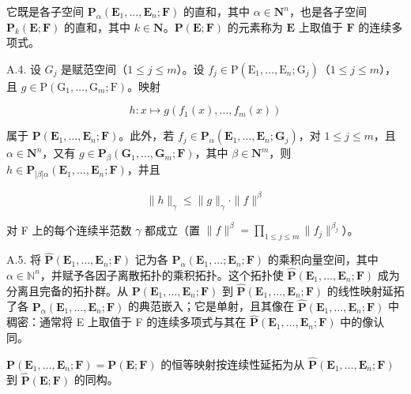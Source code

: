 它既是各子空间 \(\mathbf{P}_{\alpha}(\mathbf{E}_{1},\ldots,\mathbf{E}_{n};\mathbf{F})\) 的直和，其中 \(\alpha\in\mathbf{N}^{n}\)，也是各子空间 \(\mathbf{P}_{k}(\mathbf{E};\mathbf{F})\) 的直和，其中 \(k\in\mathbf{N}\)。\(\mathbf{P}(\mathbf{E};\mathbf{F})\) 的元素称为 \(\mathbf{E}\) 上取值于 \(\mathbf{F}\) 的连续多项式。

A.4. 设 \(G_{j}\) 是赋范空间（\(1 \leqslant j \leqslant m\)）。设 \(f_{j} \in \mathrm{P}(\mathrm{E}_{1}, \ldots, \mathrm{E}_{n}; \mathrm{G}_{j})\)（\(1 \leqslant j \leqslant m\)），且 \(g \in \mathrm{P}(\mathrm{G}_{1}, \ldots, \mathrm{G}_{m}; \mathrm{F})\)。映射

\[
h: x \mapsto g (f _ {1} (x), \dots , f _ {m} (x))
\]

属于 \(\mathbf{P}(\mathbf{E}_1,\ldots ,\mathbf{E}_n;\mathbf{F})\)。此外，若 \(f_{j}\in \mathbf{P}_{\alpha}(\mathbf{E}_{1},\ldots ,\mathbf{E}_{n};\mathbf{G}_{j})\)，对 \(1\leqslant j\leqslant m\)，且 \(\alpha \in \mathbf{N}^n\)，又有 \(g\in \mathbf{P}_{\beta}(\mathbf{G}_1,\ldots ,\mathbf{G}_m;\mathbf{F})\)，其中 \(\beta \in \mathbf{N}^{m}\)，则 \(h\in \mathbf{P}_{|\beta |\alpha}(\mathbf{E}_1,\ldots ,\mathbf{E}_n;\mathbf{F})\)，并且

\[
\| h \| _ {\gamma} \leqslant \| g \| _ {\gamma} \cdot \| f \| ^ {\beta}
\]

对 F 上的每个连续半范数 \(\gamma\) 都成立（置 \(\| f\|^{\beta} = \prod_{1 \leqslant j \leqslant m} \| f_j \|^{\beta_j}\)）。

A.5. 将 \(\hat{\mathbf{P}}(\mathbf{E}_{1},\ldots,\mathbf{E}_{n};\mathbf{F})\) 记为各 \(\mathbf{P}_{\alpha}(\mathbf{E}_{1},\ldots;\mathbf{E}_{n};\mathbf{F})\) 的乘积向量空间，其中 \(\alpha\in\mathbb{N}^{n}\)，并赋予各因子离散拓扑的乘积拓扑。这个拓扑使 \(\hat{\mathbf{P}}(\mathbf{E}_{1},\ldots,\mathbf{E}_{n};\mathbf{F})\) 成为分离且完备的拓扑群。从 \(\mathbf{P}(\mathbf{E}_{1},\ldots,\mathbf{E}_{n};\mathbf{F})\) 到 \(\hat{\mathbf{P}}(\mathbf{E}_{1},\ldots,\mathbf{E}_{n};\mathbf{F})\) 的线性映射延拓了各 \(\mathbf{P}_{\alpha}(\mathbf{E}_{1},\ldots,\mathbf{E}_{n};\mathbf{F})\) 的典范嵌入；它是单射，且其像在 \(\hat{\mathbf{P}}(\mathbf{E}_{1},\ldots,\mathbf{E}_{n};\mathbf{F})\) 中稠密：通常将 E 上取值于 F 的连续多项式与其在 \(\hat{\mathbf{P}}(\mathbf{E}_{1},\ldots,\mathbf{E}_{n};\mathbf{F})\) 中的像认同。

\(\mathbf{P}(\mathbf{E}_{1},\ldots,\mathbf{E}_{n};\mathbf{F})=\mathbf{P}(\mathbf{E};\mathbf{F})\) 的恒等映射按连续性延拓为从 \(\hat{\mathbf{P}}(\mathbf{E}_{1},\ldots,\mathbf{E}_{n};\mathbf{F})\) 到 \(\hat{\mathbf{P}}(\mathbf{E};\mathbf{F})\) 的同构。

